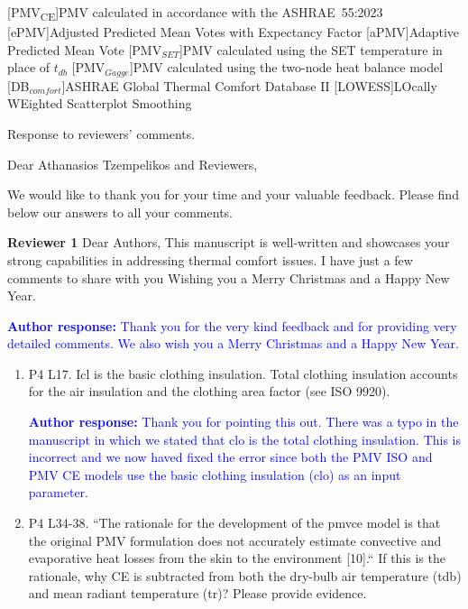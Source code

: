 \documentclass[a4paper, 10pt]{letter}
\newcommand{\response}[1]{\textcolor{blue}{\textbf{Author response:} #1}}
\begin{document}
    [PMV\textsubscript{CE}]{PMV calculated in accordance with the ASHRAE~55:2023}
    [ePMV]{Adjusted Predicted Mean Votes with Expectancy Factor}
    [aPMV]{Adaptive Predicted Mean Vote}
    [PMV$_{SET}$]{PMV calculated using the SET temperature in place of $t_{db}$}
    [PMV$_{Gagge}$]{PMV calculated using the two-node heat balance model}
    [DB$_{comfort}$]{ASHRAE Global Thermal Comfort Database II}
    [LOWESS]{LOcally WEighted Scatterplot Smoothing}

    \renewcommand{\baselinestretch}{1}\normalsize

    \begin{letter}
    {
        Response to reviewers' comments.
    }

        \opening{Dear Athanasios Tzempelikos and Reviewers,}


        We would like to thank you for your time and your valuable feedback.
        Please find below our answers to all your comments.

        \textbf{Reviewer 1}
        Dear Authors,
        This manuscript is well-written and showcases your strong capabilities in addressing thermal comfort issues.
        I have just a few comments to share with you Wishing you a Merry Christmas and a Happy New Year.

        \response{
            Thank you for the very kind feedback and for providing very detailed comments.
            We also wish you a Merry Christmas and a Happy New Year.
        }

        \begin{enumerate}

            \item P4 L17.
            Icl is the basic clothing insulation.
            Total clothing insulation accounts for the air insulation and the clothing area factor (see ISO 9920).

            \response{
                Thank you for pointing this out.
                There was a typo in the manuscript in which we stated that \ac{clo} is the total clothing insulation.
                This is incorrect and we now haved fixed the error since both the PMV ISO and PMV CE models use the basic clothing insulation (\ac{clo}) as an input parameter.
            }

            \item P4 L34-38.
            ``The rationale for the development of the \acs{pmvce} model is that the original PMV
            formulation does not accurately estimate convective and evaporative heat losses from
            the skin to the environment [10].`` If this is the rationale, why CE is subtracted from both
            the dry-bulb air temperature (tdb) and mean radiant temperature (tr)?
            Please provide evidence.


\end{enumerate}
\end{letter}
\end{document}
